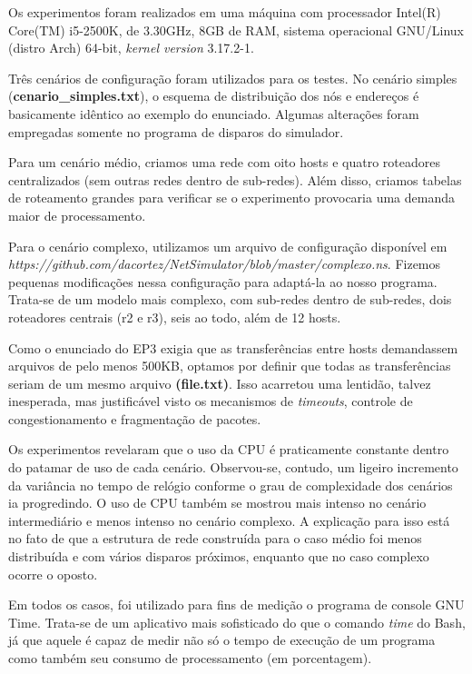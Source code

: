 \documentclass[11pt]{article}
\begin{document}
Os experimentos foram realizados em uma máquina com processador Intel(R) Core(TM) i5-2500K, de 3.30GHz, 8GB de RAM, sistema operacional GNU/Linux (distro Arch) 64-bit, \textit{kernel version} 3.17.2-1.

Três cenários de configuração foram utilizados para os testes. No cenário simples (\textbf{cenario\_simples.txt}), o esquema de distribuição dos nós e endereços é basicamente idêntico ao exemplo do enunciado. Algumas alterações foram empregadas somente no programa de disparos do simulador.

Para um cenário médio, criamos uma rede com oito hosts e quatro roteadores centralizados (sem outras redes dentro de sub-redes). Além disso, criamos tabelas de roteamento grandes para verificar se o experimento provocaria uma demanda maior de processamento.

Para o cenário complexo, utilizamos um arquivo de configuração disponível em \textit{https://github.com/dacortez/NetSimulator/blob/master/complexo.ns}. Fizemos pequenas modificações nessa configuração para adaptá-la ao nosso programa. Trata-se de um modelo mais complexo, com sub-redes dentro de sub-redes, dois roteadores centrais (r2 e r3), seis ao todo, além de 12 hosts.

Como o enunciado do EP3 exigia que as transferências entre hosts demandassem arquivos de pelo menos 500KB, optamos por definir que todas as transferências seriam de um mesmo arquivo \textbf{(file.txt)}. Isso acarretou uma lentidão, talvez inesperada, mas justificável visto os mecanismos de \textit{timeouts}, controle de congestionamento e fragmentação de pacotes.

Os experimentos revelaram que o uso da CPU é praticamente constante dentro do patamar de uso de cada cenário. Observou-se, contudo, um ligeiro incremento da variância no tempo de relógio conforme o grau de complexidade dos cenários ia progredindo. O uso de CPU também se mostrou mais intenso no cenário intermediário e menos intenso no cenário complexo. A explicação para isso está no fato de que a estrutura de rede construída para o caso médio foi menos distribuída e com vários disparos próximos, enquanto que no caso complexo ocorre o oposto.

Em todos os casos, foi utilizado para fins de medição o programa de console GNU Time. Trata-se de um aplicativo mais sofisticado do que o comando \textit{time} do Bash, já que aquele é capaz de medir não só o tempo de execução de um programa como também seu consumo de processamento (em porcentagem).
\end{document}

